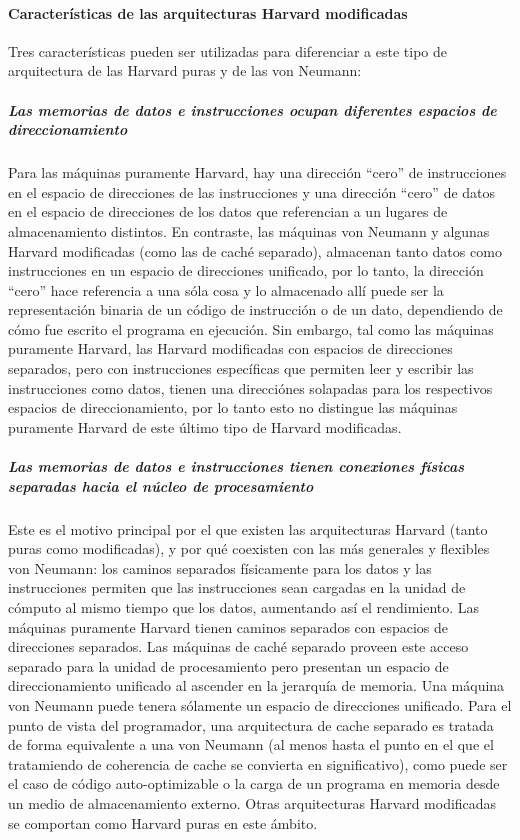 \paragraph{Características de las arquitecturas Harvard modificadas}
\label{par:theory-modern-memory_access-modified_harvard-characteristitcs}

Tres características pueden ser utilizadas para diferenciar a este tipo de
arquitectura de las Harvard puras y de las von Neumann:\\

\subparagraph{Las memorias de datos e instrucciones ocupan diferentes espacios
de direccionamiento}
\label{subpar:theory-modern-memory_access-modified_harvard-characteristitcs-1}

Para las máquinas puramente Harvard, hay una dirección ``cero'' de instrucciones
en el espacio de direcciones de las instrucciones y una dirección ``cero'' de
datos en el espacio de direcciones de los datos que referencian a un lugares de
almacenamiento distintos. En contraste, las máquinas von Neumann y algunas
Harvard modificadas (como las de caché separado), almacenan tanto datos como
instrucciones en un espacio de direcciones unificado, por lo tanto, la dirección
``cero'' hace referencia a una sóla cosa y lo almacenado allí puede ser la
representación binaria de un código de instrucción o de un dato, dependiendo de
cómo fue escrito el programa en ejecución. Sin embargo, tal como las máquinas
puramente Harvard, las Harvard modificadas con espacios de direcciones
separados, pero con instrucciones específicas que permiten leer y escribir las
instrucciones como datos, tienen una direcciónes solapadas para los respectivos
espacios de direccionamiento, por lo tanto esto no distingue las máquinas
puramente Harvard de este último tipo de Harvard modificadas.

\subparagraph{Las memorias de datos e instrucciones tienen conexiones físicas
separadas hacia el núcleo de procesamiento}
\label{subpar:theory-modern-memory_access-modified_harvard-characteristitcs-2}

Este es el motivo principal por el que existen las arquitecturas Harvard (tanto
puras como modificadas), y por qué coexisten con las más generales y flexibles
von Neumann: los caminos separados físicamente para los datos y las
instrucciones permiten que las instrucciones sean cargadas en la unidad de
cómputo al mismo tiempo que los datos, aumentando así el rendimiento. Las
máquinas puramente Harvard tienen caminos separados con espacios de direcciones
separados. Las máquinas de caché separado proveen este acceso separado para la
unidad de procesamiento pero presentan un espacio de direccionamiento unificado
al ascender en la jerarquía de memoria. Una máquina von Neumann puede tenera
sólamente un espacio de direcciones unificado. Para el punto de vista del
programador, una arquitectura de cache separado es tratada de forma equivalente
a una von Neumann (al menos hasta el punto en el que el tratamiendo de
coherencia de cache se convierta en significativo), como puede ser el caso de
código auto-optimizable o la carga de un programa en memoria desde un medio de
almacenamiento externo. Otras arquitecturas Harvard modificadas se comportan
como Harvard puras en este ámbito.

